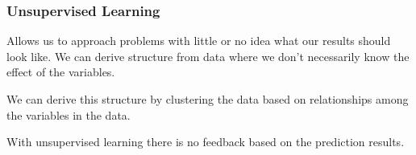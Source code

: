 \subsubsection{Unsupervised Learning}
Allows us to approach problems with little or no idea what our results should look like. We can derive structure from data where we don't necessarily know the effect of the variables.

We can derive this structure by clustering the data based on relationships among the variables in the data.

With unsupervised learning there is no feedback based on the prediction results.
